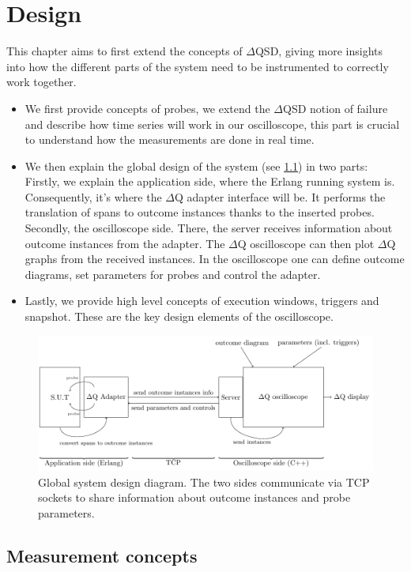 \chapter{Design}
    This chapter aims to first extend the concepts of $\Delta$QSD, giving more insights into how the different parts of the system need to be instrumented to correctly work together.
    \begin{itemize}
        \item We first provide concepts of probes, we extend the $\Delta$QSD notion of failure and describe how time series will work in our oscilloscope, this part is crucial to understand how the measurements are done in real time.
        \item We then explain the global design of the system (see \cref{fig:sys_diag}) in two parts: \\
            Firstly, we explain the application side, where the Erlang running system is. Consequently, it's where the $\Delta$Q adapter interface will be. It performs the translation of spans to outcome instances thanks to the inserted probes. \\
            Secondly, the oscilloscope side. There, the server receives information about outcome instances from the adapter. The $\Delta$Q oscilloscope can then plot $\Delta$Q graphs from the received instances. In the oscilloscope one can define outcome diagrams, set parameters for probes and control the adapter.
        \item Lastly, we provide high level concepts of execution windows, triggers and snapshot. These are the key design elements of the oscilloscope. 
    \end{itemize}

    \begin{figure}[H]
        \begin{center}
            \includegraphics[scale = 0.8]{tikz/sut-stub-osc.pdf}
        \end{center}
        \caption{Global system design diagram. The two sides communicate via TCP sockets to share information about outcome instances and probe parameters.}
        \label{fig:sys_diag}
    \end{figure}

    \section{Measurement concepts}
    
    
    
      
    
    
     
    
